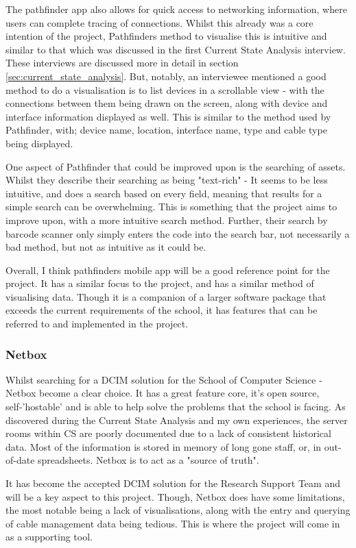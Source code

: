 \documentclass [11pt,a4paper]{article}
\begin{document}
The pathfinder app also allows for quick access to networking information, where users can complete tracing of connections. Whilst this already was a core intention of the project, Pathfinders method to visualise this is intuitive and similar to that which was discussed in the first Current State Analysis interview. These interviews are discussed more in detail in section \ref{sec:current_state_analysis}. But, notably, an interviewee mentioned a good method to do a visualisation is to list devices in a scrollable view - with the connections between them being drawn on the screen, along with device and interface information displayed as well. This is similar to the method used by Pathfinder, with; device name, location, interface name, type and cable type being displayed. 

One aspect of Pathfinder that could be improved upon is the searching of assets. Whilst they describe their searching as being "text-rich" - It seems to be less intuitive, and does a search based on every field, meaning that results for a simple search can be overwhelming. This is something that the project aims to improve upon, with a more intuitive search method. Further, their search by barcode scanner only simply enters the code into the search bar, not necessarily a bad method, but not as intuitive as it could be. 

Overall, I think pathfinders mobile app will be a good reference point for the project. It has a similar focus to the project, and has a similar method of visualising data. Though it is a companion of a larger software package that exceeds the current requirements of the school, it has features that can be referred to and implemented in the project.

\subsubsection{Netbox}
\label{sec:netbox}
Whilst searching for a DCIM solution for the School of Computer Science - Netbox become a clear choice. It has a great feature core, it's open source, self-'hostable' and is able to help solve the problems that the school is facing. As discovered during the Current State Analysis and my own experiences, the server rooms within CS are poorly documented due to a lack of consistent historical data. Most of the information is stored in memory of long gone staff, or, in out-of-date spreadsheets. Netbox is to act as a "source of truth"\cite{Netbox}. 

It has become the accepted DCIM solution for the Research Support Team and will be a key aspect to this project. Though, Netbox does have some limitations, the most notable being a lack of visualisations, along with the entry and querying of cable management data being tedious. This is where the project will come in as a supporting tool. 
\end{document}

